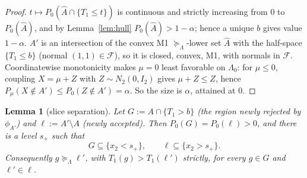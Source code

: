 \documentclass[12pt]{article}
\newtheorem{lemma}{Lemma}
\theoremstyle{remark}
\newcommand{\Lam}{\Lambda}
\newcommand{\Feas}{\mathcal F}
\newcommand{\sucL}{\succeq_\Lam}
\newcommand{\hA}{\widehat A}
\begin{document}
\begin{proof}
$t\mapsto P_0(\hA\cap\{T_1\le t\})$ is continuous and strictly increasing from $0$ to $P_0(\hA)$, and by Lemma~\ref{lem:hull} $P_0(\hA)>1-\alpha$; hence a unique $b$ gives value $1-\alpha$. $A'$ is an intersection of the convex M1 $\sucL$-lower set $\hA$ with the half-space $\{T_1\le b\}$ (normal $(1,1)\in\Feas$), so it is closed, convex, M1, with normals in $\Feas$. Coordinatewise monotonicity makes $\mu=0$ least favorable on $\Lam_0$: for $\mu\le0$, coupling $X=\mu+Z$ with $Z\sim N_2(0,I_2)$ gives $\mu+Z\le Z$, hence $P_\mu(X\notin A')\le P_0(Z\notin A')=\alpha$. So the size is $\alpha$, attained at $0$.
\end{proof}

\begin{lemma}[slice separation]\label{lem:slice}
Let $G:=A\cap\{T_1>b\}$ (the region newly rejected by $\phi_{A'}$) and $\ell:=A'\setminus A$ (newly accepted). Then $P_0(G)=P_0(\ell)>0$, and there is a level $s_+$ such that
\[
G\subseteq\{x_2<s_+\},\qquad \ell\subseteq\{x_2>s_+\}.
\]
Consequently $g\sucL \ell'$, with $T_1(g)>T_1(\ell')$ strictly, for every $g\in G$ and $\ell'\in\ell$.
\end{lemma}
\end{document}
